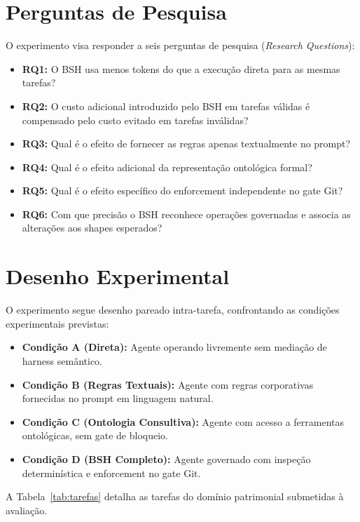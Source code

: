 \documentclass[10pt,a4paper]{article}
\begin{document}
\section{Perguntas de Pesquisa}
O experimento visa responder a seis perguntas de pesquisa (\emph{Research Questions}):
\begin{itemize}
  \item \textbf{RQ1:} O BSH usa menos tokens do que a execução direta para as mesmas tarefas?
  \item \textbf{RQ2:} O custo adicional introduzido pelo BSH em tarefas válidas é compensado pelo custo evitado em tarefas inválidas?
  \item \textbf{RQ3:} Qual é o efeito de fornecer as regras apenas textualmente no prompt?
  \item \textbf{RQ4:} Qual é o efeito adicional da representação ontológica formal?
  \item \textbf{RQ5:} Qual é o efeito específico do enforcement independente no gate Git?
  \item \textbf{RQ6:} Com que precisão o BSH reconhece operações governadas e associa as alterações aos shapes esperados?
\end{itemize}

\section{Desenho Experimental}
O experimento segue desenho pareado intra-tarefa, confrontando as condições experimentais previstas:
\begin{itemize}
  \item \textbf{Condição A (Direta):} Agente operando livremente sem mediação de harness semântico.
  \item \textbf{Condição B (Regras Textuais):} Agente com regras corporativas fornecidas no prompt em linguagem natural.
  \item \textbf{Condição C (Ontologia Consultiva):} Agente com acesso a ferramentas ontológicas, sem gate de bloqueio.
  \item \textbf{Condição D (BSH Completo):} Agente governado com inspeção determinística e enforcement no gate Git.
\end{itemize}

A Tabela~\ref{tab:tarefas} detalha as tarefas do domínio patrimonial submetidas à avaliação.
\end{document}
